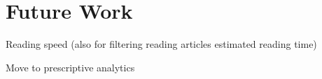 \chapter{Future Work}


Reading speed (also for filtering reading articles estimated reading time)

Move to prescriptive analytics


